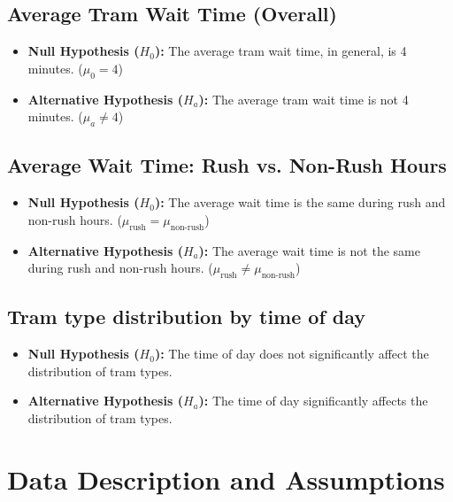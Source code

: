 \documentclass[a4paper, 10pt]{article}
\begin{document}
		\subsection{Average Tram Wait Time (Overall)}
			\label{sec:wait_time_hypothesis}
			\begin{itemize}
					\item \textbf{Null Hypothesis ($H_0$):} The average tram wait time, in general, is 4 minutes. ($\mu_0 = 4$)
					\item \textbf{Alternative Hypothesis ($H_a$):} The average tram wait time is not 4 minutes. ($\mu_a \neq 4$)
			\end{itemize}

		\subsection{Average Wait Time: Rush vs. Non-Rush Hours}
			\label{sec:wait_time_rush_non_rush_hypothesis}
			\begin{itemize}
					\item \textbf{Null Hypothesis ($H_0$):} The average wait time is the same during rush and non-rush hours. ($\mu_{\text{rush}} = \mu_{\text{non-rush}}$)
					\item \textbf{Alternative Hypothesis ($H_a$):} The average wait time is not the same during rush and non-rush hours. ($\mu_{\text{rush}} \neq \mu_{\text{non-rush}}$)
			\end{itemize}

		\subsection{Tram type distribution by time of day}
			\label{sec:tram_type_distribution_hypothesis}
			\begin{itemize}
					\item \textbf{Null Hypothesis ($H_0$):} The time of day does not significantly affect the distribution of tram types.
					\item \textbf{Alternative Hypothesis ($H_a$):} The time of day significantly affects the distribution of tram types.
			\end{itemize}

	\newpage
	\section{Data Description and Assumptions}
\end{document}
